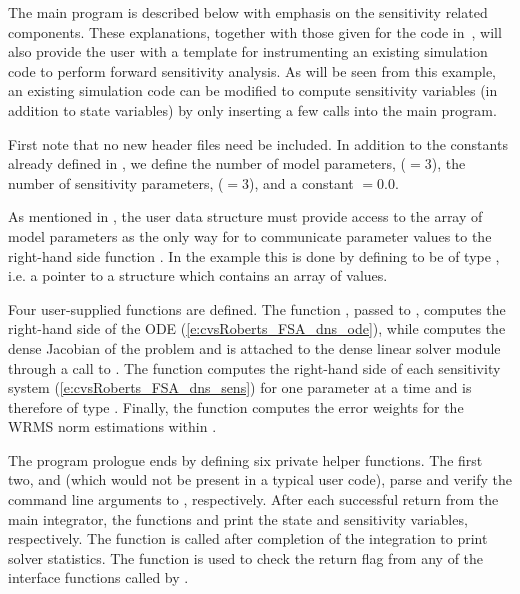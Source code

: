 The main program is described below with emphasis on the sensitivity related components. 
These explanations, together with those given for the code 
in~\cite{cvode_ex}, will also provide the user with a template for instrumenting 
an existing simulation code to perform forward sensitivity analysis.
As will be seen from this example, an existing simulation code can be modified to compute 
sensitivity variables (in addition to state variables) by only inserting a few {\cvodes} 
calls into the main program. 

First note that no new header files need be included. In addition to the constants already
defined in , we define the number of model parameters,  ($=3$),
the number of sensitivity parameters,  ($=3$), and a constant  $=0.0$. 

As mentioned in , the user data structure 
must provide access to the array of model parameters as the only way for
{\cvodes} to communicate parameter values to the right-hand side function
. In the  example this is done by defining
 to be of type , i.e. a pointer to a structure which contains
an array of   values.

Four user-supplied functions are defined. The function , passed to ,
computes the right-hand side of the ODE (\ref{e:cvsRoberts_FSA_dns_ode}), while
 computes the dense Jacobian of the problem and is attached to the
dense linear solver module {\cvdense} through a call to .
The function  computes the right-hand side of each sensitivity system
(\ref{e:cvsRoberts_FSA_dns_sens}) for one parameter at a time and is therefore of type
. Finally, the function  computes the error weights for the WRMS norm
estimations within {\cvodes}.

The program prologue ends by defining six private helper functions.  The first two,
 and  (which would not be present in a typical user code),
parse and verify the command line arguments to , respectively.
After each successful return from the main {\cvodes} integrator, the functions 
 and  print the state and sensitivity variables,
respectively. The function  is called after completion of the
integration to print solver statistics.
The function  is used to check the return flag from any of the
{\cvodes} interface functions called by .

